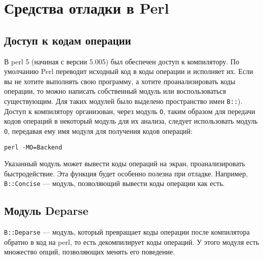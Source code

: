 \section{Средства отладки в Perl}
\subsection{Доступ к кодам операции}
В perl 5 (начиная с версии 5.005) был обеспечен доступ к компилятору. По умолчанию Perl переводит исходный код в коды операции и исполняет их. Если вы не хотите выполнять свою программу, а хотите проанализировать коды операции, то можно написать собственный модуль или воспользоваться существующим. Для таких модулей было выделено пространство имен \verb|B::|). Доступ к компилятору организован, через модуль \verb|O|, таким образом для передачи кодов операций в некоторый модуль для их анализа, следует использовать модуль \verb|O|, передавая ему имя модуля для получения кодов операций:
\begin{verbatim}
perl -MO=Backend
\end{verbatim}
Указанный модуль может вывести коды операций на экран, проанализировать быстродействие. Эта функция будет особенно полезна при отладке. Например, \verb|B::Concise| --- модуль, позволяющий вывести коды операции как есть.

\subsection{Модуль Deparse}
\verb|B::Deparse| --- модуль, который превращает коды операции после компилятора обратно в код на perl, то есть декомпилирует коды операций. У этого модуля есть множество опций, позволяющих менять его поведение.

